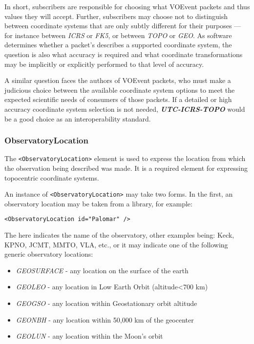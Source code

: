 \documentclass[11pt,a4paper]{ivoa}
\begin{document}
In short, subscribers are responsible for choosing what VOEvent packets and thus
 values they will accept. Further, subscribers may choose
not to distinguish between coordinate systems that are only subtly different for
their purposes --- for instance between \emph{ICRS} or \emph{FK5}, or between
\emph{TOPO} or \emph{GEO}. As software determines whether a packet's
 describes a supported coordinate system, the question is also
what accuracy is required and what coordinate transformations may be implicitly
or explicitly performed to that level of accuracy.

A similar question faces the authors of VOEvent packets, who must make a
judicious choice between the available coordinate system options to meet the
expected scientific needs of consumers of those packets. If a detailed or high
accuracy coordinate system selection is not needed, \emph\textbf{UTC-ICRS-TOPO}
would be a good choice as an interoperability standard.

\subsubsection{ObservatoryLocation}
\label{sec:3.4.2}
The \verb|<ObservatoryLocation>| element is used to express the location from
which the observation being described was made. It is a required element for
expressing topocentric coordinate systems.

An instance of \verb|<ObservatoryLocation>| may take two forms. In the first,
an observatory location may be taken from a library, for example:
\begin{lstlisting}
<ObservatoryLocation id="Palomar" />
\end{lstlisting}

The  here indicates the name of the observatory, other examples being:
Keck, KPNO, JCMT, MMTO, VLA, etc., or it may indicate one of the following
generic observatory locations:
\begin{itemize}
\item \emph{GEOSURFACE} - any location on the surface of the earth
\item \emph{GEOLEO} - any location in Low Earth Orbit (altitude<700 km)
\item \emph{GEOGSO} - any location within Geostationary orbit altitude
\item \emph{GEONBH} - any location within 50,000 km of the geocenter
\item \emph{GEOLUN} - any location within the Moon's orbit
\end{itemize}
\end{document}
